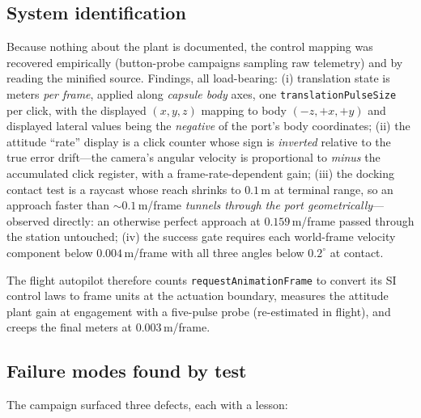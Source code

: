 \documentclass[11pt]{article}
\begin{document}
\subsection{System identification}

Because nothing about the plant is documented, the control mapping was
recovered empirically (button-probe campaigns sampling raw telemetry) and
by reading the minified source. Findings, all load-bearing:
(i) translation state is meters \emph{per frame}, applied along
\emph{capsule body} axes, one \texttt{translationPulseSize} per click, with
the displayed $(x,y,z)$ mapping to body $(-z,+x,+y)$ and displayed lateral
values being the \emph{negative} of the port's body coordinates;
(ii) the attitude ``rate'' display is a click counter whose sign is
\emph{inverted} relative to the true error drift---the camera's angular
velocity is proportional to \emph{minus} the accumulated click register,
with a frame-rate-dependent gain;
(iii) the docking contact test is a raycast whose reach shrinks to
$0.1$\,m at terminal range, so an approach faster than $\sim0.1$\,m/frame
\emph{tunnels through the port geometrically}---observed directly: an
otherwise perfect approach at $0.159$\,m/frame passed through the station
untouched;
(iv) the success gate requires each world-frame velocity component below
$0.004$\,m/frame with all three angles below $0.2^\circ$ at contact.

The flight autopilot therefore counts \texttt{requestAnimationFrame} to
convert its SI control laws to frame units at the actuation boundary,
measures the attitude plant gain at engagement with a five-pulse probe
(re-estimated in flight), and creeps the final meters at $0.003$\,m/frame.

\subsection{Failure modes found by test}

The campaign surfaced three defects, each with a lesson:
\end{document}
